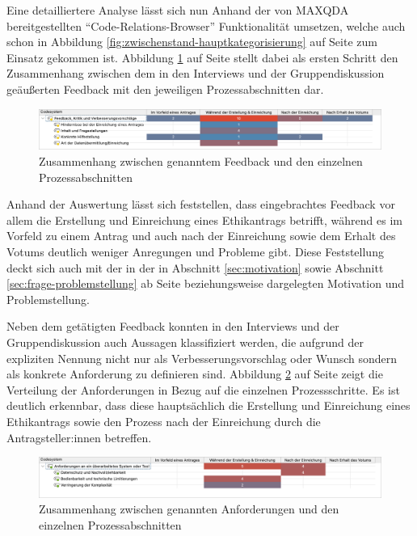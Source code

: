 \documentclass[a4paper,12pt,twoside,numbers=noendperiod]{scrreprt}
\begin{document}
\medskip

Eine detailliertere Analyse lässt sich nun Anhand der von MAXQDA bereitgestellten \enquote{Code-Relations-Browser} Funktionalität umsetzen, welche auch schon in Abbildung \ref{fig:zwischenstand-hauptkategorisierung} auf Seite \pageref{fig:zwischenstand-hauptkategorisierung} zum Einsatz gekommen ist. Abbildung \ref{fig:feedback-x-prozess} auf Seite \pageref{fig:feedback-x-prozess} stellt dabei als ersten Schritt den Zusammenhang zwischen dem in den Interviews und der Gruppendiskussion geäußerten Feedback mit den jeweiligen Prozessabschnitten dar.

\begin{figure}[ht]
    \centering
    \includegraphics[width=\linewidth]{thesis/images/Luidold_Feedback-Prozess.png}
    \caption{Zusammenhang zwischen genanntem Feedback und den einzelnen Prozessabschnitten}
    \label{fig:feedback-x-prozess}
\end{figure}

\clearpage

Anhand der Auswertung lässt sich feststellen, dass eingebrachtes Feedback vor allem die Erstellung und Einreichung eines Ethikantrags betrifft, während es im Vorfeld zu einem Antrag und auch nach der Einreichung sowie dem Erhalt des Votums deutlich weniger Anregungen und Probleme gibt. Diese Feststellung deckt sich auch mit der in der in Abschnitt \ref{sec:motivation} sowie Abschnitt \ref{sec:frage-problemstellung} ab Seite \pageref{sec:motivation} beziehungsweise \pageref{sec:frage-problemstellung} dargelegten Motivation und Problemstellung.

\medskip

Neben dem getätigten Feedback konnten in den Interviews und der Gruppendiskussion auch Aussagen klassifiziert werden, die aufgrund der expliziten Nennung nicht nur als Verbesserungsvorschlag oder Wunsch sondern als konkrete Anforderung zu definieren sind. Abbildung \ref{fig:anforderungen-x-prozess} auf Seite \pageref{fig:anforderungen-x-prozess} zeigt die Verteilung der Anforderungen in Bezug auf die einzelnen Prozessschritte. Es ist deutlich erkennbar, dass diese hauptsächlich die Erstellung und Einreichung eines Ethikantrags sowie den Prozess nach der Einreichung durch die Antragsteller:innen betreffen.

\begin{figure}[ht]
    \centering
    \includegraphics[width=\linewidth]{thesis/images/Luidold_Anforderungen-Prozess.png}
    \caption{Zusammenhang zwischen genannten Anforderungen und den einzelnen Prozessabschnitten}
    \label{fig:anforderungen-x-prozess}
\end{figure}
\end{document}
